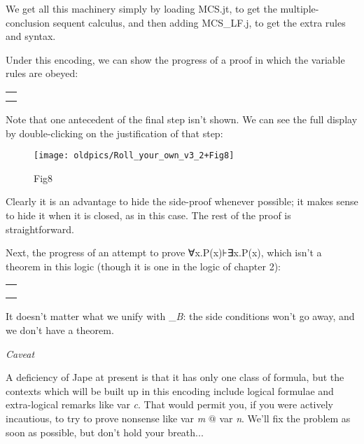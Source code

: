 \documentclass[11pt]{book}
\begin{document}
We get all this machinery simply by loading MCS.jt, to get the multiple-conclusion sequent calculus, and then adding MCS\_LF.j, to get the extra rules and syntax.


Under this encoding, we can show the progress of a proof in which the variable rules are obeyed:\\


\begin{tabular}{|p{3.292in}|}
\hline
{\raggedright }\\
\hline
{\raggedright }\\
\hline
{\raggedright }\\
\hline
\end{tabular}


Note that one antecedent of the final step isn't shown. We can see the full display by double-clicking on the justification of that step:

\begin{figure}[htbp]
\begin{center}
\texttt{[image: oldpics/Roll\_your\_own\_v3\_2+Fig8]}
\caption{Fig8}
\end{center}
\end{figure}


Clearly it is an advantage to hide the side-proof whenever possible; it makes sense to hide it when it is closed, as in this case. The rest of the proof is straightforward.


Next, the progress of an attempt to prove ∀x.P(x){\nobreakspace}⊦{\nobreakspace}∃x.P(x), which isn't a theorem in this logic (though it is one in the logic of chapter 2):\\


\begin{tabular}{|p{4.500in}|}
\hline
{\raggedright }\\
\hline
{\raggedright }\\
\hline
{\raggedright }\\
\hline
{\raggedright }\\
\hline
\end{tabular}


It doesn't matter what we unify with \_\textit{B}: the side conditions won't go away, and we don't have a theorem.


\textit{Caveat}


A deficiency of Jape at present is that it has only one class of formula, but the contexts which will be built up in this encoding include logical formulae and extra-logical remarks like var \textit{c}. That would permit you, if you were actively incautious, to try to prove nonsense like var \textit{m} \ensuremath{@} var \textit{n}. We'll fix the problem as soon as possible, but don't hold your breath...
\end{document}
